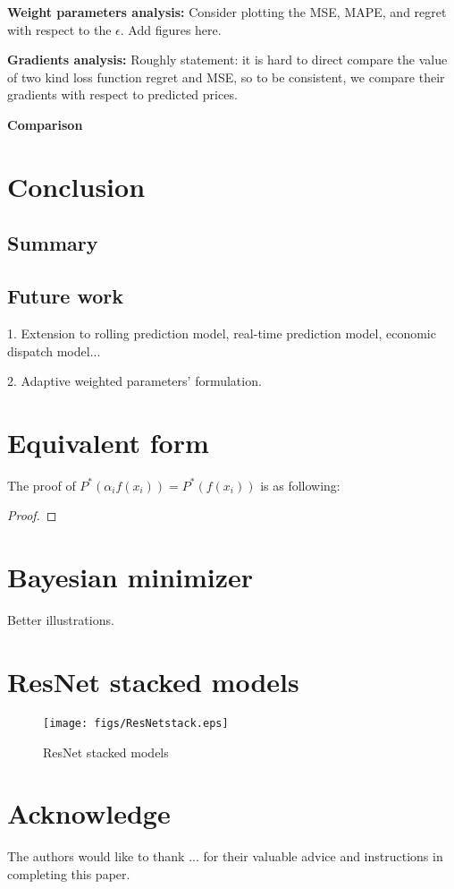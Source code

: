 \documentclass[journal]{IEEEtran}
\newcommand{\slw}{\color{blue}}
\begin{document}
\textbf{Weight parameters analysis:}
{\slw Consider plotting the MSE, MAPE, and regret with respect to the $\epsilon$. Add figures here.}

\textbf{Gradients analysis:} 
{\slw Roughly statement: it is hard to direct compare the value of two kind loss function regret and MSE, so to be consistent, we compare their gradients with respect to predicted prices.}

\textbf{Comparison}

\section{Conclusion}
\subsection{Summary}

\subsection{Future work}
1. Extension to rolling prediction model, real-time prediction model, economic dispatch model...

2. Adaptive weighted parameters' formulation.

\appendices

\section{Equivalent form}
The proof of $P^*(\alpha_i f(x_i)) = P^*(f(x_i))$ is as following:
\begin{proof}
  
\end{proof}

\section{Bayesian minimizer}
Better illustrations.

\section{ResNet stacked models}


\begin{figure}[h]
  \centering
  \texttt{[image: figs/ResNetstack.eps]}
  \caption{ResNet stacked models}
  \label{ResNetstack}
\end{figure}

\section*{Acknowledge}
The authors would like to thank ... for their valuable advice and instructions in completing this paper.
\end{document}
